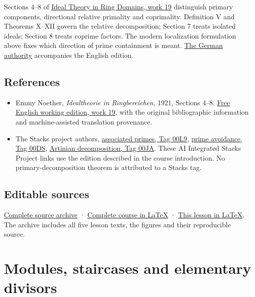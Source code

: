 \documentclass[
]{article}
\providecommand{\tightlist}{%
  \setlength{\itemsep}{0pt}\setlength{\parskip}{0pt}}
\begin{document}
Sections 4--8 of
\href{https://github.com/KokunoYumeto/emmy-noether-en/blob/main/source/Noether_English_ED0014.tex}{Ideal
Theory in Ring Domains, work 19} distinguish primary components,
directional relative primality and coprimality. Definition V and
Theorems X--XII govern the relative decomposition; Section 7 treats
isolated ideals; Section 8 treats coprime factors. The modern
localization formulation above fixes which direction of prime
containment is meant. \href{https://doi.org/10.5281/zenodo.21908301}{The
German authority} accompanies the English edition.

\subsection{References}\label{references}

\begin{itemize}
\tightlist
\item
  Emmy Noether, \emph{Idealtheorie in Ringbereichen}, 1921, Sections
  4--8.
  \href{https://github.com/KokunoYumeto/emmy-noether-en/blob/main/source/Noether_English_ED0014.tex}{Free
  English working edition, work 19}, with the original bibliographic
  information and machine-assisted translation provenance.
\item
  The Stacks project authors,
  \href{https://kokunoyumeto.github.io/stacks-zh-hans-cn/en/algebra.html\#section-ass}{associated
  primes, Tag 00L9},
  \href{https://kokunoyumeto.github.io/stacks-zh-hans-cn/en/algebra.html\#lemma-silly}{prime
  avoidance, Tag 00DS},
  \href{https://kokunoyumeto.github.io/stacks-zh-hans-cn/en/algebra.html\#lemma-product-local}{Artinian
  decomposition, Tag 00JA}. These AI Integrated Stacks Project links use
  the edition described in the course introduction. No
  primary-decomposition theorem is attributed to a Stacks tag.
\end{itemize}

\subsection{Editable sources}\label{editable-sources}

\href{ideal-theory-in-rings-source.zip}{Complete source archive} ·
\href{ideal-theory-in-rings.tex}{Complete course in LaTeX} ·
\href{NOE-IDL-02.tex}{This lesson in LaTeX}. The archive includes all
five lesson texts, the figures and their reproducible source.

\section{Modules, staircases and elementary
divisors}\label{modules-staircases-and-elementary-divisors}
\end{document}
